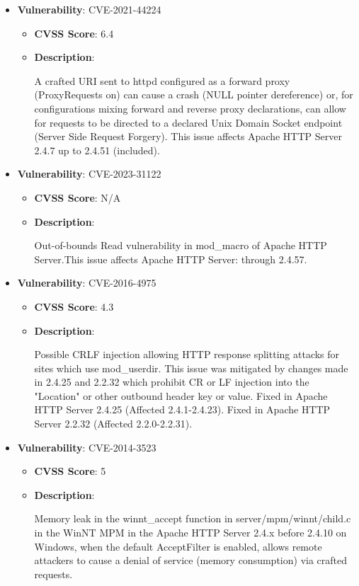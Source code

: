 \documentclass{article}
\begin{document}
\begin{itemize}
        \item \textbf{Vulnerability}: CVE-2021-44224
        \begin{itemize}
            \item \textbf{CVSS Score}:  6.4 
            \item \textbf{Description}:
            \parbox[t]{0.9\linewidth}{
                \ttfamily A crafted URI sent to httpd configured as a forward proxy (ProxyRequests on) can cause a crash (NULL pointer dereference) or, for configurations mixing forward and reverse proxy declarations, can allow for requests to be directed to a declared Unix Domain Socket endpoint (Server Side Request Forgery). This issue affects Apache HTTP Server 2.4.7 up to 2.4.51 (included).
            }
        \end{itemize}
    
        \item \textbf{Vulnerability}: CVE-2023-31122
        \begin{itemize}
            \item \textbf{CVSS Score}:  N/A 
            \item \textbf{Description}:
            \parbox[t]{0.9\linewidth}{
                \ttfamily Out-of-bounds Read vulnerability in mod\_macro of Apache HTTP Server.This issue affects Apache HTTP Server: through 2.4.57.
            }
        \end{itemize}
    
        \item \textbf{Vulnerability}: CVE-2016-4975
        \begin{itemize}
            \item \textbf{CVSS Score}:  4.3 
            \item \textbf{Description}:
            \parbox[t]{0.9\linewidth}{
                \ttfamily Possible CRLF injection allowing HTTP response splitting attacks for sites which use mod\_userdir. This issue was mitigated by changes made in 2.4.25 and 2.2.32 which prohibit CR or LF injection into the "Location" or other outbound header key or value. Fixed in Apache HTTP Server 2.4.25 (Affected 2.4.1-2.4.23). Fixed in Apache HTTP Server 2.2.32 (Affected 2.2.0-2.2.31).
            }
        \end{itemize}
    
        \item \textbf{Vulnerability}: CVE-2014-3523
        \begin{itemize}
            \item \textbf{CVSS Score}:  5 
            \item \textbf{Description}:
            \parbox[t]{0.9\linewidth}{
                \ttfamily Memory leak in the winnt\_accept function in server/mpm/winnt/child.c in the WinNT MPM in the Apache HTTP Server 2.4.x before 2.4.10 on Windows, when the default AcceptFilter is enabled, allows remote attackers to cause a denial of service (memory consumption) via crafted requests.
            }
        \end{itemize}
    

\end{itemize}
\end{document}
